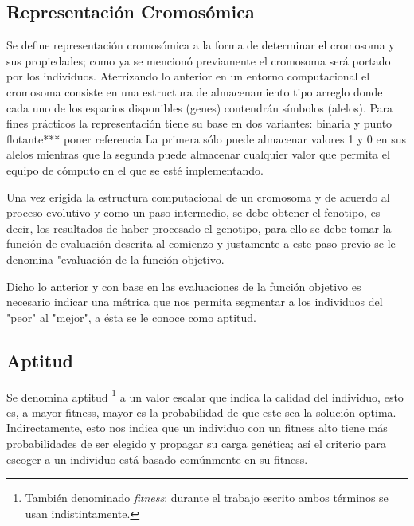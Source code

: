 \documentclass[class=report, crop=false]{standalone}
\begin{document}
\subsection{Representación Cromosómica}
\label{sec:c2_5}
Se define representación cromosómica a la forma de determinar 
el cromosoma y sus propiedades; como ya se mencionó previamente 
el cromosoma será portado por los individuos.\break
Aterrizando lo anterior en un entorno computacional el cromosoma 
consiste en una estructura de almacenamiento tipo arreglo donde cada 
uno de los espacios disponibles (genes) contendrán símbolos (alelos).
Para fines prácticos la representación tiene su base en dos variantes: 
binaria y punto flotante*** poner referencia
La primera sólo puede almacenar valores 1 y 0 en sus alelos mientras 
que la segunda puede almacenar cualquier valor que permita el equipo 
de cómputo en el que se esté implementando.

Una vez erigida la estructura computacional de un cromosoma y de
acuerdo al proceso evolutivo y como un paso intermedio, se debe
obtener el fenotipo, es decir, los resultados de haber procesado el 
genotipo, para ello se debe tomar la función de evaluación descrita al
comienzo y justamente a este paso previo se le denomina "evaluación de la
función objetivo.\break

Dicho lo anterior y con base en las evaluaciones de la función objetivo 
es necesario indicar una métrica que nos permita segmentar a los individuos 
del "peor" al "mejor", a ésta se le conoce como aptitud.

\subsection{Aptitud}
\label{sec:c2_3}
Se denomina aptitud \footnote{También denominado \textit{fitness}; 
durante el trabajo escrito ambos términos se usan indistintamente.} 
a un valor escalar que indica la calidad del individuo, esto es, 
a mayor fitness, mayor es la probabilidad de que este sea la 
solución optima.\break
Indirectamente, esto nos indica que un individuo con un 
fitness alto tiene más probabilidades de ser elegido y propagar 
su carga genética; así el criterio para escoger a un individuo 
está basado comúnmente en su fitness.\medskip\break
\end{document}
